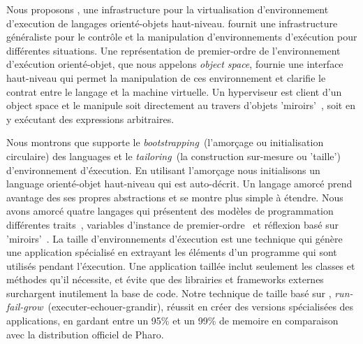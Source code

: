 \documentclass[a4paper,11pt,twoside]{include/ThesisStyle}
\begin{document}
Nous proposons \Vtt, une infrastructure pour la virtualisation d'environnement d'execution de langages orienté-objets haut-niveau. \Vtt fournit une infrastructure généraliste pour le contrôle et la manipulation d'environnements d'exécution pour différentes situations. Une représentation de premier-ordre de l'environnement d'exécution orienté-objet, que nous appelons \emph{object space}, fournie une interface haut-niveau qui permet la manipulation de ces environnement et clarifie le contrat entre le langage et la machine virtuelle. Un hyperviseur est client d'un object space et le manipule soit directement au travers d'objets 'miroirs'~\cite{Brac04b}, soit en y exécutant des expressions arbitraires.

Nous montrons que \Vtt supporte le \emph{bootstrapping}~(\ie l'amorçage ou initialisation circulaire) des languages et le \emph{tailoring}~(\ie la construction sur-mesure ou 'taille') d'environnement d'éxecution. En utilisant l'amorçage nous initialisons un language orienté-objet haut-niveau qui est auto-décrit. Un langage amorcé prend avantage des ses propres abstractions et se montre plus simple à étendre. Nous avons amorcé quatre langages qui présentent des modèles de programmation différentes \eg traits~\cite{Scha03a}, variables d'instance de premier-ordre~\cite{Verw11a} et réflexion basé sur 'miroirs'~\cite{Brac04b}. La taille d'environnements d'éxecution est une technique qui génère une application spécialisé en extrayant les éléments d'un programme qui sont utilisés pendant l'éxecution. Une application taillée inclut seulement les classes et méthodes qu'il nécessite, et évite que des librairies et frameworks externes surchargent inutilement la base de code. Notre technique de taille basé sur \Vtt, \emph{run-fail-grow}~(\ie executer-echouer-grandir), réussit en créer des versions spécialisées des applications, en gardant entre un 95\% et un 99\% de memoire en comparaison avec la distribution officiel de Pharo.

\renewcommand{\baselinestretch}{1}\normalsize
\tableofcontents

\renewcommand{\baselinestretch}{1.2}\normalsize
\mainmatter
{}




\end{document}
